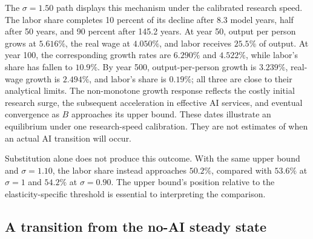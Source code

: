 The $\sigma=1.50$ path displays this mechanism under the calibrated research
speed. The labor share completes 10 percent of its decline after 8.3 model
years, half after 50 years, and 90 percent after 145.2 years. At year 50,
output per person grows at $5.616\%$, the real wage at $4.050\%$, and labor
receives $25.5\%$ of output. At year 100, the corresponding growth rates are
$6.290\%$ and $4.522\%$, while labor's share has fallen to $10.9\%$. By year
500, output-per-person growth is $3.239\%$, real-wage growth is $2.494\%$,
and labor's share is $0.19\%$; all three are close to their analytical limits.
The non-monotone growth response reflects the costly initial research surge,
the subsequent acceleration in effective AI services, and eventual convergence
as $B$ approaches its upper bound. These dates illustrate an equilibrium under
one research-speed calibration. They are not estimates of when an actual AI
transition will occur.

Substitution alone does not produce this outcome. With the same upper bound
and $\sigma=1.10$, the labor share instead approaches $50.2\%$, compared
with $53.6\%$ at $\sigma=1$ and $54.2\%$ at $\sigma=0.90$.
The upper bound's position relative to the elasticity-specific threshold is
essential to interpreting the comparison.

\subsection{A transition from the no-AI steady state}
\label{subsec:rewrite-ramsey-start}

